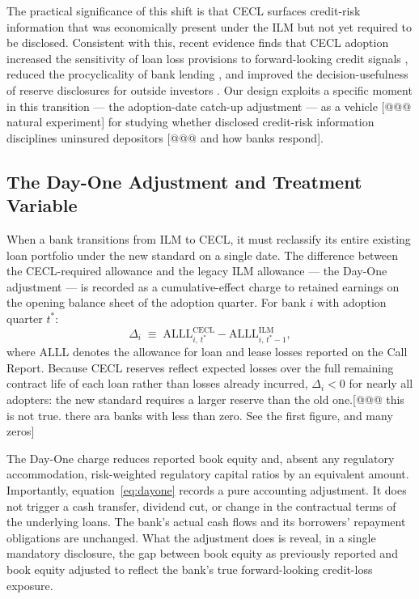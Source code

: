 The practical significance of this shift is that CECL surfaces credit-risk
information that was economically present under the ILM but not yet required to
be disclosed.  Consistent with this, recent evidence finds that CECL adoption
increased the sensitivity of loan loss provisions to forward-looking credit
signals \citep{granja2025current, kim2026current}, reduced the procyclicality
of bank lending \citep{chen2022does}, and improved the decision-usefulness of
reserve disclosures for outside investors \citep{gee2022decision}.  Our design
exploits a specific moment in this transition --- the adoption-date catch-up
adjustment --- as a vehicle [@@@ natural experiment] for studying whether disclosed credit-risk
information disciplines uninsured depositors [@@@ and how banks respond].

\subsection{The Day-One Adjustment and Treatment Variable}
\label{sec:background:dayone}

When a bank transitions from ILM to CECL, it must reclassify its entire existing
loan portfolio under the new standard on a single date.  The difference between
the CECL-required allowance and the legacy ILM allowance --- the Day-One
adjustment --- is recorded as a cumulative-effect charge to retained earnings on
the opening balance sheet of the adoption quarter.  For bank $i$ with adoption
quarter $t^{*}$:
\begin{equation}
  \Delta_i
  \;\equiv\;
  \mathrm{ALLL}^{\mathrm{CECL}}_{i,\,t^{*}}
  -
  \mathrm{ALLL}^{\mathrm{ILM}}_{i,\,t^{*}-1},
  \label{eq:dayone}
\end{equation}
where $\mathrm{ALLL}$ denotes the allowance for loan and lease losses reported
on the Call Report.  Because CECL reserves reflect expected losses over the
full remaining contract life of each loan rather than losses already incurred,
$\Delta_i < 0$ for nearly all adopters: the new standard requires a larger
reserve than the old one.[@@@ this is not true. there ara banks with less than zero. See the first figure, and many zeros]

The Day-One charge reduces reported book equity and, absent any regulatory
accommodation, risk-weighted regulatory capital ratios by an equivalent amount.
Importantly, equation~\eqref{eq:dayone} records a pure accounting adjustment.
It does not trigger a cash transfer, dividend cut, or change in the contractual
terms of the underlying loans.  The bank's actual cash flows and its
borrowers' repayment obligations are unchanged.  What the adjustment does is
reveal, in a single mandatory disclosure, the gap between book equity as
previously reported and book equity adjusted to reflect the bank's true
forward-looking credit-loss exposure.


